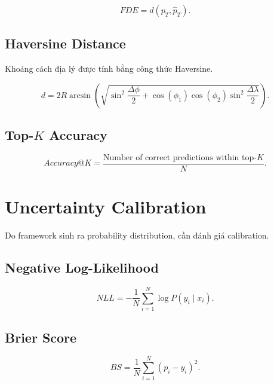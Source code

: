 \documentclass[11pt,a4paper]{article}
\begin{document}
	\begin{equation}
		FDE
		=
		d(
		p_T,\hat{p}_T
		).
	\end{equation}
	
	\subsection{Haversine Distance}
	
	Khoảng cách địa lý được tính bằng công thức Haversine.
	
	\begin{equation}
		d
		=
		2R
		\arcsin
		\left(
		\sqrt{
			\sin^2
			\frac{\Delta\phi}{2}
			+
			\cos(\phi_1)
			\cos(\phi_2)
			\sin^2
			\frac{\Delta\lambda}{2}
		}
		\right).
	\end{equation}
	
	\subsection{Top-$K$ Accuracy}
	
	\begin{equation}
		Accuracy@K
		=
		\frac{
			\text{Number of correct predictions within top-}K
		}{
			N
		}.
	\end{equation}
	
	\section{Uncertainty Calibration}
	
	Do framework sinh ra probability distribution, cần đánh giá calibration.
	
	\subsection{Negative Log-Likelihood}
	
	\begin{equation}
		NLL
		=
		-\frac{1}{N}
		\sum_{i=1}^{N}
		\log
		P(y_i\mid x_i).
	\end{equation}
	
	\subsection{Brier Score}
	
	\begin{equation}
		BS
		=
		\frac{1}{N}
		\sum_{i=1}^{N}
		(p_i-y_i)^2.
	\end{equation}
	
\end{document}
